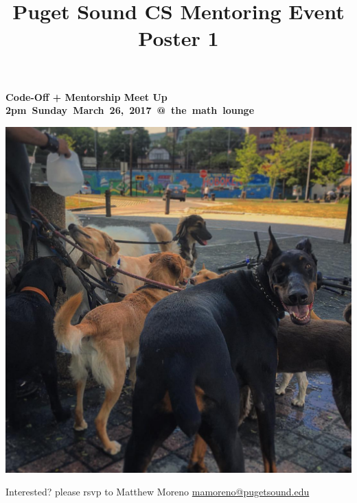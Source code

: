 \documentclass[12pt,letterpaper]{article}
\title{Puget Sound CS Mentoring Event Poster 1}
\begin{document}
{\fontsize{40pt}{42pt}\bfseries\selectfont\color{HighlightColor}%
Code-Off + Mentorship Meet Up
}%
~\hfill
{\LARGE\bfseries%
\mbox{2pm Sunday March 26, 2017 @ the math lounge}%
}


%

{\centering%
\includegraphics[width=0.93\linewidth]{dogs}%
\par}


\vspace{-3ex}
\begin{large}
\justify
{ \par}

\end{large}



{\LARGE Interested?}
\hfill
{\Large please rsvp to Matthew Moreno \url{mamoreno@pugetsound.edu}}
\end{document}
